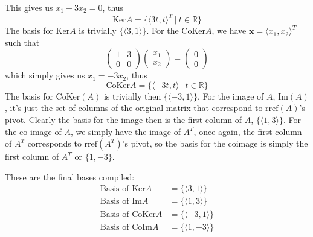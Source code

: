 \documentclass{article}
\begin{document}
This gives us $x_1 - 3x_2 = 0$, thus 
\begin{equation*}
    \text{Ker}A = \{\langle 3t, t \rangle^{T} \ | \ t\in\mathbb{R}\}
\end{equation*}
The basis for $\text{Ker}A$ is trivially $\{\langle 3, 1\rangle\}$. For the $\text{CoKer}A$, we have $\mathbf{x} = \langle x_1, x_{2} \rangle^{T}$ such that
\begin{equation*}
     \begin{pmatrix}
        1 & 3\\
        0 & 0
    \end{pmatrix}\begin{pmatrix}
        x_1\\
        x_2
    \end{pmatrix} = \begin{pmatrix}
        0\\
        0
    \end{pmatrix}
\end{equation*}
which simply gives us $x_1 = -3x_2$, thus
\begin{equation*}
    \text{CoKer}A = \{\langle -3t, t \rangle \ | \ t \in \mathbb{R}\}
\end{equation*}
The basis for $\text{CoKer}(A)$ is trivially then $\{\langle -3,1\rangle\}$. For the image of $A$, $\text{Im}(A)$, it's just the set of columns of the original matrix that correspond to $\text{rref}(A)$'s pivot. Clearly the basis for the image then is the first column of $A$, $\{\langle 1, 3\rangle\}$. For the co-image of $A$, we simply have the image of $A^{T}$, once again, the first column of $A^{T}$ corresponds to $\text{rref}(A^{T})$'s pivot, so the basis for the coimage is simply the first column of $A^T$ or $\{1, -3\}$.
\begin{finans*}
These are the final bases compiled:
    \begin{align*}
        \text{Basis of Ker}A &= \{\langle 3,1\rangle\}\\
        \text{Basis of Im}A &= \{\langle 1,3\rangle\}\\
        \text{Basis of CoKer}A &= \{\langle -3, 1\rangle\}\\
        \text{Basis of CoIm}A &= \{\langle 1, -3 \rangle\}
    \end{align*}
\end{finans*}
\end{document}
